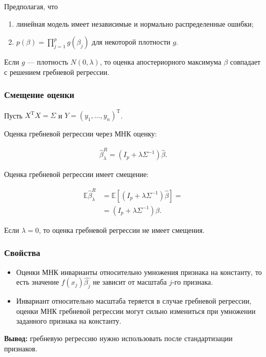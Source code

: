 \documentclass[unicode, notheorems]{beamer}
\newcommand{\E}{\mathbb{E}}
\newcommand{\T}{\mathrm{T}}
\begin{document}
\begin{frame}
\begin{frame}
Предполагая, что 
\begin{enumerate}
\item линейная модель имеет независимые и нормально распределенные ошибки; 
\item $p(\beta) = \prod_{j = 1}^p g(\beta_j)$ для некоторой плотности $g$.
\end{enumerate}

\vspace{0.5cm}
Если $g$ --- плотность $N(0,\lambda)$, то  оценка апостериорного максимума $\beta$ совпадает с решением гребневой регрессии.

\end{frame}


\begin{frame}
\frametitle{Смещение оценки}

Пусть $X^{\T}X = \Sigma$ и $Y = (y_1, \ldots, y_n)^{\T}$.

Оценка гребневой регрессии через МНК оценку:

\begin{align*}
\hat{\beta}_{\lambda}^R = (I_p + \lambda \Sigma^{-1})\hat{\beta}.  
\end{align*}

Оценка гребневой регрессии имеет смещение:

\begin{align*}
\E\hat{\beta}_{\lambda}^{R} &= \E[(I_p + \lambda \Sigma^{-1})\hat{\beta}] = \\
	&= (I_p + \lambda \Sigma^{-1})\beta.
\end{align*} 

Если $\lambda = 0$, то оценка гребневой регрессии не имеет смещения.
\end{frame}





\begin{frame}
\frametitle{Свойства}

\begin{itemize}
\item Оценки МНК инварианты относительно умножения признака на константу, то есть значение $f(x_j)\hat{\beta_j}$ не зависит от масштаба $j$-го признака. 
\item Инвариант относительно масштаба теряется в случае гребневой регрессии, оценки МНК гребневой регрессии могут сильно измениться при умножении заданного признака на константу.
\end{itemize}

\vspace{0.3cm}
\textbf{Вывод:} гребневую регрессию нужно использовать после стандартизации признаков.
\vspace{0.8cm}


\end{frame}
\end{frame}
\end{document}
